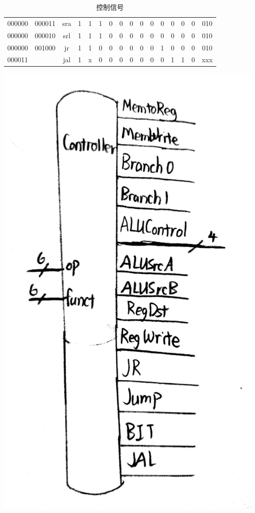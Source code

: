 \documentclass[twocolumn]{article} %
\begin{document}
\begin{sloppypar}
\begin{table}[t]
\begin{tabular}{cccccccccccccccc}
000000                      & 000011                     & sra                   & 1                       & 1                       & 1                       & 0                       & 0                       & 0                       & 0                       & 0                       & 0                       & 0                      & 0                        & 0                        & 010   \\
000000                      & 000010                     & srl                   & 1                       & 1                       & 1                       & 0                       & 0                       & 0                       & 0                       & 0                       & 0                       & 0                      & 0                        & 0                        & 010   \\
000000                      & 001000                     & jr                    & 1                       & 1                       & 0                       & 0                       & 0                       & 0                       & 0                       & 0                       & 1                       & 0                      & 0                        & 0                        & 010   \\
000011                      &                            & jal                   & 1                       & x                       & 0                       & 0                       & 0                       & 0                       & 0                       & 0                       & 0                       & 1                      & 1                        & 0                        & xxx   \\ \hline
\end{tabular}
\caption{控制信号}
\label{tab:controller}
\end{table}

\includegraphics[width =0.3 \linewidth]{figure/Controller.jpg}


\end{sloppypar}
\end{document}
